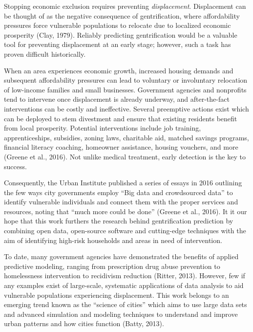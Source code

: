 \documentclass[12pt,]{article}
\begin{document}
Stopping economic exclusion requires preventing \emph{displacement}.
Displacement can be thought of as the negative consequence of
gentrification, where affordability pressures force vulnerable
populations to relocate due to localized economic prosperity (Clay,
1979). Reliably predicting gentrification would be a valuable tool for
preventing displacement at an early stage; however, such a task has
proven difficult historically.

When an area experiences economic growth, increased housing demands and
subsequent affordability pressures can lead to voluntary or involuntary
relocation of low-income families and small businesses. Government
agencies and nonprofits tend to intervene once displacement is already
underway, and after-the-fact interventions can be costly and
ineffective. Several preemptive actions exist which can be deployed to
stem divestment and ensure that existing residents benefit from local
prosperity. Potential interventions include job training,
apprenticeships, subsidies, zoning laws, charitable aid, matched savings
programs, financial literacy coaching, homeowner assistance, housing
vouchers, and more (Greene et al., 2016). Not unlike medical treatment,
early detection is the key to success.

Consequently, the Urban Institute published a series of essays in 2016
outlining the few ways city governments employ ``Big data and
crowdsourced data'' to identify vulnerable individuals and connect them
with the proper services and resources, noting that ``much more could be
done'' (Greene et al., 2016). It it our hope that this work furthers the
research behind gentrification prediction by combining open data,
open-source software and cutting-edge techniques with the aim of
identifying high-risk households and areas in need of intervention.

To date, many government agencies have demonstrated the benefits of
applied predictive modeling, ranging from prescription drug abuse
prevention to homelessness intervention to recidivism reduction (Ritter,
2013). However, few if any examples exist of large-scale, systematic
applications of data analysis to aid vulnerable populations experiencing
displacement. This work belongs to an emerging trend known as the
``science of cities'' which aims to use large data sets and advanced
simulation and modeling techniques to understand and improve urban
patterns and how cities function (Batty, 2013).
\end{document}
